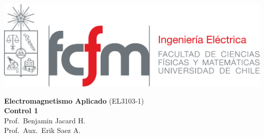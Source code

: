 \documentclass[
  11pt,
  letterpaper,
   addpoints,
  ]{exam}
\begin{document}
\noindent
\begin{minipage}{0.47\textwidth}
\includegraphics[width=\textwidth]{../fcfm_die}
\end{minipage}
\begin{minipage}{0.53\textwidth}
\begin{center} 
\large\textbf{Electromagnetismo Aplicado} (EL3103-1) \\
\large\textbf{Control 1} \\
\normalsize Prof.~Benjamin Jacard H.\\
\normalsize Prof.~Aux.~Erik Saez A.
\end{center}
\end{minipage}

\vspace{0.5cm}
\noindent
\vspace{.85cm}
\end{document}
